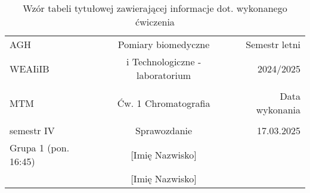 \documentclass[oneside]{mwart}  %
\begin{document}
\pagestyle{fancy}

\fancyhf{}


\begin{table}[h]
\centering
\caption{Wzór tabeli tytułowej zawierającej informacje dot. wykonanego ćwiczenia}  
\label{tab:Tabela tytułowa}
\begin{tabular}{lcr}
\hline
AGH                  &  Pomiary biomedyczne                 & Semestr letni  \\
WEAIiIB              &  i Technologiczne - laboratorium     &  2024/2025  \\

 & & \\    %
 
MTM                  & Ćw. 1 Chromatografia                 & Data wykonania  \\ 

 & & \\    %
 
semestr IV           & Sprawozdanie                         & 17.03.2025  \\ 
Grupa 1 (pon. 16:45) & [Imię Nazwisko]                      &   \\ 
                     & [Imię Nazwisko]                      &   \\ 
\hline
\end{tabular}
\end{table}


\end{document}
